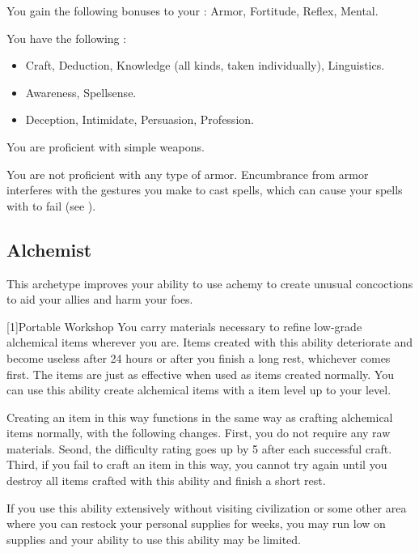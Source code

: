         You gain the following bonuses to your :  Armor,  Fortitude,  Reflex,  Mental.

        You have the following :
        \begin{itemize}
            \item {} Craft, Deduction, Knowledge (all kinds, taken individually), Linguistics.
            \item {} Awareness, Spellsense.
            \item {} Deception, Intimidate, Persuasion, Profession.
        \end{itemize}

        You are proficient with simple weapons.

        You are not proficient with any type of armor.
        Encumbrance from armor interferes with the gestures you make to cast spells, which can cause your spells with  to fail (see ).

    \subsection{Alchemist}
        This archetype improves your ability to use achemy to create unusual concoctions to aid your allies and harm your foes.

        [1]{Portable Workshop} 
        You carry materials necessary to refine low-grade alchemical items wherever you are.
        Items created with this ability deteriorate and become useless after 24 hours or after you finish a long rest, whichever comes first.
        The items are just as effective when used as items created normally.
        You can use this ability create alchemical items with a item level up to your level.

        Creating an item in this way functions in the same way as crafting alchemical items normally, with the following changes.
        First, you do not require any raw materials.
        Seond, the difficulty rating goes up by 5 after each successful craft.
        Third, if you fail to craft an item in this way, you cannot try again until you destroy all items crafted with this ability and finish a short rest.

        If you use this ability extensively without visiting civilization or some other area where you can restock your personal supplies for weeks, you may run low on supplies and your ability to use this ability may be limited.

